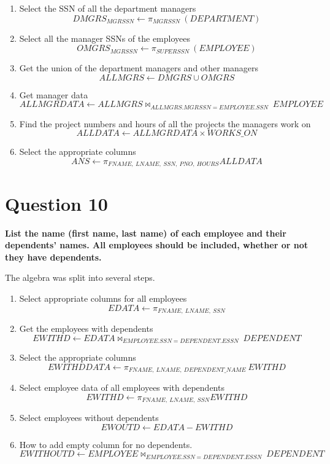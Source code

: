 \documentclass{article}
\begin{document}
    \begin{enumerate}
        \item Select the SSN of all the department managers
        \[ DMGRS_{MGRSSN} \gets \pi _{MGRSSN} \: (DEPARTMENT) \]
        \item Select all the manager SSNs of the employees
        \[ OMGRS_{MGRSSN} \gets \pi _{SUPERSSN} \: (EMPLOYEE) \]
        \item Get the union of the department managers and other managers
        \[ ALLMGRS \gets DMGRS \cup OMGRS \]
        \item Get manager data
        \[ALLMGRDATA \gets ALLMGRS \bowtie _{ALLMGRS.MGRSSN=EMPLOYEE.SSN} \: EMPLOYEE \]
        \item Find the project numbers and hours of all the projects the managers work on
        \[ ALLDATA \gets ALLMGRDATA \times WORKS\_ON \]
        \item Select the appropriate columns
        \[ ANS \gets \pi _{FNAME, \: LNAME, \: SSN, \: PNO, \: HOURS} ALLDATA \]

    \end{enumerate}

\section{Question 10}

    \textbf{List the name (first name, last name) of each employee and their dependents' names.  All employees should be included, whether or not they have dependents.}
    
    The algebra was split into several steps.

    \begin{enumerate}
        \item Select appropriate columns for all employees
        \[ EDATA \gets \pi _{FNAME, \: LNAME, \: SSN} \]
        \item Get the employees with dependents
        \[ EWITHD \gets EDATA \bowtie _{EMPLOYEE.SSN=DEPENDENT.ESSN} \: DEPENDENT \]
        \item Select the appropriate columns
        \[ EWITHDDATA \gets \pi _{FNAME, \: LNAME, \: DEPENDENT\_NAME} \: EWITHD \]
        \item Select employee data of all employees with dependents
        \[ EWITHD \gets \pi _{FNAME, \: LNAME, \: SSN} EWITHD \]
        \item Select employees without dependents
        \[ EWOUTD \gets EDATA - EWITHD \]
        \item How to add empty column for no dependents.
        \[ EWITHOUTD \gets EMPLOYEE \bowtie _{EMPLOYEE.SSN=DEPENDENT.ESSN} \: DEPENDENT \]
    \end{enumerate}
    
\end{document}
